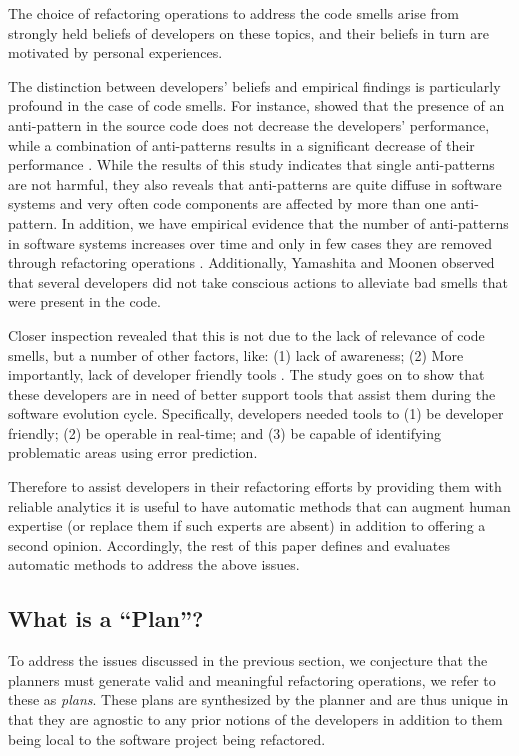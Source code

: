\documentclass{sig-alternate}
\begin{document}
{\begin{itemize}[leftmargin=3mm]
The choice of refactoring operations to address the code smells arise from strongly held beliefs of developers on these topics, and their beliefs in turn are motivated by personal experiences. 

The distinction between developers' beliefs and empirical findings is particularly profound in the case of code smells. For instance, \cite{abbes11} showed that the presence of an anti-pattern in the source code does not decrease the developers' performance, while a combination of anti-patterns results in a significant decrease of their performance \cite{abbes11}\cite{yama13}. While the results of this study indicates that single anti-patterns are not harmful, they also reveals that anti-patterns are quite diffuse in software systems and very often code components are affected by more than one anti-pattern. In addition, we have empirical evidence that the number of anti-patterns in software systems increases over time and only in few cases they are removed through refactoring operations \cite{arcoverde11}\cite{chatzigeorgiou10}. Additionally, Yamashita and Moonen\cite{} observed that several developers did not take conscious actions to alleviate bad smells that were present in the code. 

Closer inspection revealed that this is not due to the lack of relevance of code smells, but a number of other factors, like: (1) lack of awareness; (2) More importantly, lack of developer friendly tools \cite{}. The study goes on to show that these developers are in need of better support tools that assist them during the software evolution cycle.  Specifically, developers needed tools to (1) be developer friendly; (2) be operable in real-time; and (3) be capable of identifying problematic areas using error prediction.

Therefore to assist developers in their refactoring efforts by providing them with reliable analytics it is useful to have automatic methods that can augment human expertise (or replace them if such experts are absent) in addition to offering a second opinion. Accordingly, the rest of this paper defines and evaluates automatic methods to address the above issues.
  

\subsection{What is a ``Plan''?}
To address the issues discussed in the previous section, we conjecture that the planners must generate valid and meaningful refactoring operations, we refer to these as \textit{plans}. These plans are synthesized by the planner and are thus unique in that they are agnostic to any prior notions of the developers in addition to them being local to the software project being refactored.  


\end{itemize}}
\end{document}
